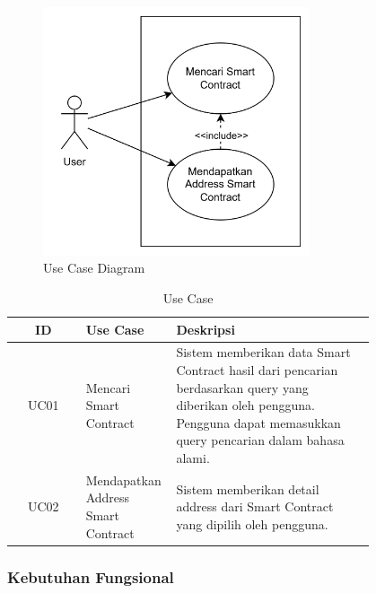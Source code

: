 \begin{figure}[ht]
	\centering
	\includegraphics[width=0.7\textwidth]{resources/chapter-3/use-case.png}
	\caption{Use Case Diagram}
	\label{image:usecase}
\end{figure}

\begin{table}[h]
	\caption{Use Case}
	\label{tabel:use-case}
	\vspace{0.25cm}
	\begin{center}
		\begin{tabular}{|c|p{0.25\linewidth}|p{0.55\linewidth}|}
			\hline
			\textbf{ID} & \textbf{Use Case}                  & \textbf{Deskripsi}                                                                                                                                                       \\ \hline
			UC01        & Mencari Smart Contract             & Sistem memberikan data Smart Contract hasil dari pencarian berdasarkan query yang diberikan oleh pengguna. Pengguna dapat memasukkan query pencarian dalam bahasa alami. \\ \hline
			UC02        & Mendapatkan Address Smart Contract & Sistem memberikan detail address dari Smart Contract yang dipilih oleh pengguna.                                                                                         \\ \hline
		\end{tabular}
	\end{center}
\end{table}

\subsubsection{Kebutuhan Fungsional}

